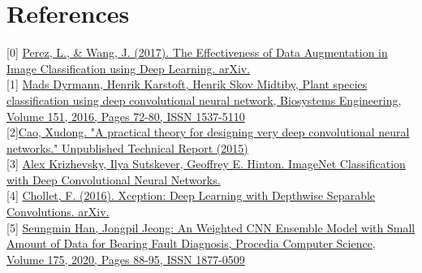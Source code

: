 \documentclass[11pt, oneside]{article}
\begin{document}
\section*{References}
[0] \href{https://doi.org/10.48550/arXiv.1712.04621}{Perez, L., \& Wang, J. (2017). The Effectiveness of Data Augmentation in Image Classification using Deep Learning. arXiv.}\\
{[1]} \href{https://doi.org/10.1016/j.biosystemseng.2016.08.024}{Mads Dyrmann, Henrik Karstoft, Henrik Skov Midtiby, Plant species classification using deep convolutional neural network, Biosystems Engineering, Volume 151, 2016, Pages 72-80, ISSN 1537-5110} \\
{[2]}\href{https://www.kaggle.com/blobs/download/forum-message-attachment-files/2287/A%20practical%20theory%20for%20designing%20very%20deep%20convolutional%20neural%20networks.pdf}{Cao, Xudong. "A practical theory for designing very deep convolutional neural networks." Unpublished Technical Report (2015)}\\
{[3]} \href{https://proceedings.neurips.cc/paper/2012/file/c399862d3b9d6b76c8436e924a68c45b-Paper.pdf}{Alex Krizhevsky, Ilya Sutskever, Geoffrey E. Hinton. ImageNet Classification with Deep Convolutional Neural Networks.} \\
{[4]} \href{https://arxiv.org/pdf/1610.02357.pdf}{Chollet, F. (2016). Xception: Deep Learning with Depthwise Separable Convolutions. arXiv. }\\
{[5]} \href{https://doi.org/10.1016/j.procs.2020.07.015}{Seungmin Han, Jongpil Jeong: An Weighted CNN Ensemble Model with Small Amount of Data for Bearing Fault Diagnosis, Procedia Computer Science, Volume 175, 2020, Pages 88-95, ISSN 1877-0509} \\
\end{document}
